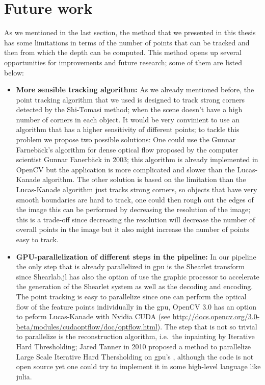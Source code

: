 \section{Future work}

As we mentioned in the last section, the method that we presented in this thesis has some limitations in terms of the number of points that can be tracked and then from which the depth can be computed. This method opens up several opportunities for improvements and future research; some of them are listed below:

\begin{itemize}
\item \textbf{More sensible tracking algorithm:} As we already mentioned before, the point tracking algorithm that we used is designed to track strong corners detected by the Shi-Tomasi method; when the scene doesn't have a high number of corners in each object. It would be very convinient to use an algorithm that has a higher sensitivity of different points; to tackle this problem we propose two possible solutions: One could use the Gunnar Farneb\"ack's algorithm for dense optical flow proposed by the computer scientist Gunnar Fanerb\"ack in 2003\cite{Gunnar}; this algorithm is already implemented in OpenCV but the application is more complicated and slower than the Lucas-Kanade algorithm. The other solution is based on the limitation than the Lucas-Kanade algorithm just tracks strong corners, so objects that have very smooth boundaries are hard to track, one could then rough out the edges of the image this can be performed by decreasing the resolution of the image; this is a trade-off since decreasing the resolution will decrease the number of overall points in the image but it also might increase the number of points easy to track. 

\item \textbf{GPU-parallelization of different steps in the pipeline:} In our pipeline the only step that is already parallelized in gpu is the Shearlet transform since Shearlab.jl has also the option of use the graphic processor to accelerate the generation of the Shearlet system as well as the decoding and encoding. The point tracking is easy to parallelize since one can perform the optical flow of the feature points individually in the gpu, OpenCV 3.0 has an option to peform Lucas-Kanade with Nvidia CUDA (see \url{http://docs.opencv.org/3.0-beta/modules/cudaoptflow/doc/optflow.html}). The step that is not so trivial to parallelize is the reconstruction algorithm, i.e.\ the inpainting by Iterative Hard Thresholding; Jared Tanner in 2010 proposed a method to parallelize Large Scale Iterative Hard Thersholding on gpu's \cite{Tanner}, although the code is not open source yet one could try to implement it in some high-level language like julia.


\end{itemize}
